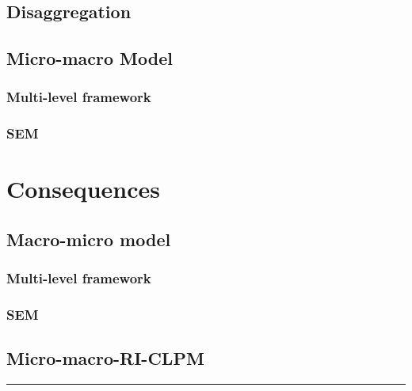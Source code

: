 \documentclass[
]{book}
\begin{document}
\hypertarget{disaggregation}{%
\subsection{Disaggregation}\label{disaggregation}}

\hypertarget{micro-macro-model}{%
\subsection{Micro-macro Model}\label{micro-macro-model}}

\hypertarget{multi-level-framework}{%
\subsubsection{Multi-level framework}\label{multi-level-framework}}

\hypertarget{sem}{%
\subsubsection{SEM}\label{sem}}

\hypertarget{consequences-2}{%
\section{Consequences}\label{consequences-2}}

\hypertarget{macro-micro-model}{%
\subsection{Macro-micro model}\label{macro-micro-model}}

\hypertarget{multi-level-framework-1}{%
\subsubsection{Multi-level framework}\label{multi-level-framework-1}}

\hypertarget{sem-1}{%
\subsubsection{SEM}\label{sem-1}}

\hypertarget{micro-macro-ri-clpm}{%
\subsection{Micro-macro-RI-CLPM}\label{micro-macro-ri-clpm}}

\begin{center}\rule{0.5\linewidth}{0.5pt}\end{center}
\end{document}
